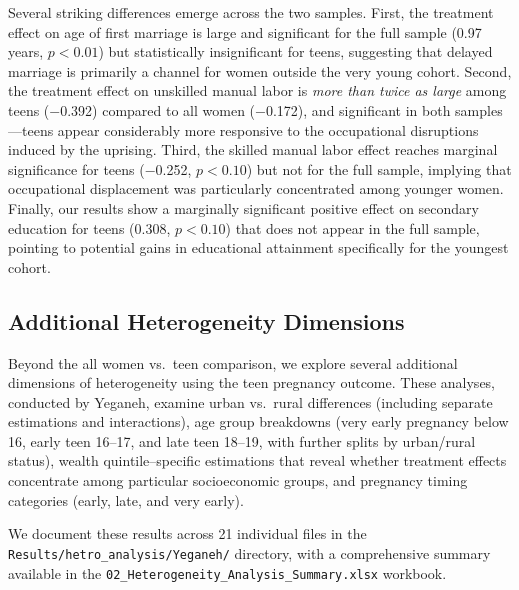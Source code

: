 \documentclass[12pt,a4paper]{article}
\begin{document}
\noindent Several striking differences emerge across the two samples. First, the treatment effect on age of first marriage is large and significant for the full sample (0.97 years, $p<0.01$) but statistically insignificant for teens, suggesting that delayed marriage is primarily a channel for women outside the very young cohort. Second, the treatment effect on unskilled manual labor is \textit{more than twice as large} among teens ($-$0.392) compared to all women ($-$0.172), and significant in both samples---teens appear considerably more responsive to the occupational disruptions induced by the uprising. Third, the skilled manual labor effect reaches marginal significance for teens ($-$0.252, $p<0.10$) but not for the full sample, implying that occupational displacement was particularly concentrated among younger women. Finally, our results show a marginally significant positive effect on secondary education for teens (0.308, $p<0.10$) that does not appear in the full sample, pointing to potential gains in educational attainment specifically for the youngest cohort.
\vspace{0.25cm}

\subsection{Additional Heterogeneity Dimensions}

Beyond the all women vs.\ teen comparison, we explore several additional dimensions of heterogeneity using the teen pregnancy outcome. These analyses, conducted by Yeganeh, examine urban vs.\ rural differences (including separate estimations and interactions), age group breakdowns (very early pregnancy below 16, early teen 16--17, and late teen 18--19, with further splits by urban/rural status), wealth quintile--specific estimations that reveal whether treatment effects concentrate among particular socioeconomic groups, and pregnancy timing categories (early, late, and very early).
\vspace{0.25cm}

\noindent We document these results across 21 individual files in the \texttt{Results/hetro\_analysis/Yeganeh/} directory, with a comprehensive summary available in the \texttt{02\_Heterogeneity\_Analysis\_Summary.xlsx} workbook.
\vspace{0.25cm}

\end{document}
